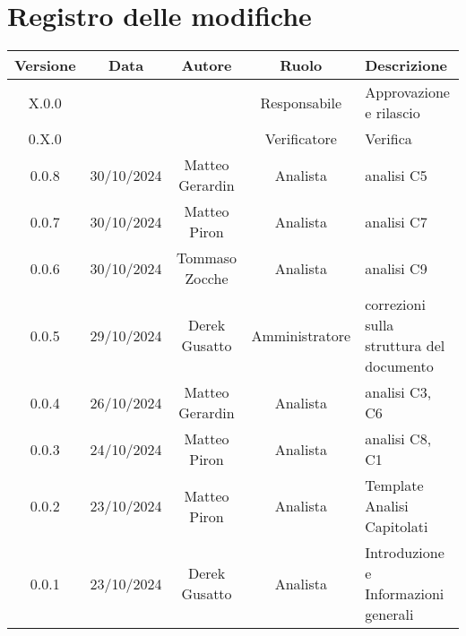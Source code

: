 
\section*{Registro delle modifiche}
\begin{table}[H]
    \begin{tabular}{|c|c|c|c|p{3cm}|}
        \hline
        \textbf{Versione} &  \textbf{Data} &  \textbf{Autore} &  \textbf{Ruolo} & \textbf{Descrizione} \\
        \hline
        X.0.0 &  &  & Responsabile & Approvazione e rilascio\\
        \hline
        0.X.0 &  &  & Verificatore & Verifica\\
        \hline
        0.0.8 & 30/10/2024 & Matteo Gerardin & Analista & analisi C5 \\
        \hline
        0.0.7 & 30/10/2024 & Matteo Piron & Analista & analisi C7 \\
        \hline
        0.0.6 & 30/10/2024 & Tommaso Zocche & Analista & analisi C9 \\
        \hline
        0.0.5 & 29/10/2024 & Derek Gusatto & Amministratore &  correzioni sulla struttura del documento\\
        \hline
        0.0.4 & 26/10/2024 & Matteo Gerardin & Analista & analisi C3, C6 \\
        \hline
        0.0.3 & 24/10/2024 & Matteo Piron & Analista & analisi C8, C1 \\
        \hline
        0.0.2 & 23/10/2024 & Matteo Piron & Analista & Template Analisi Capitolati \\
        \hline
        0.0.1 & 23/10/2024 & Derek Gusatto & Analista & Introduzione e Informazioni generali \\
        \hline
    \end{tabular}
\end{table}